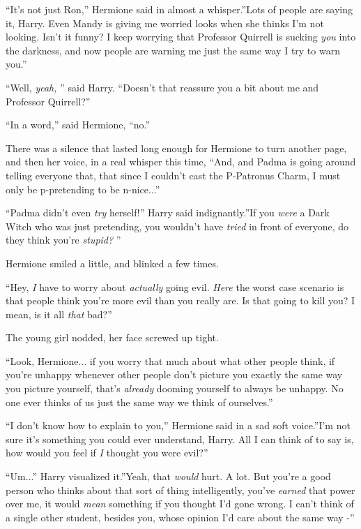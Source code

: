 ``It's not just Ron,'' Hermione said in almost a whisper.''Lots of
people are saying it, Harry. Even Mandy is giving me worried looks when
she thinks I'm not looking. Isn't it funny? I keep worrying that
Professor Quirrell is sucking \emph{you} into the darkness, and now
people are warning me just the same way I try to warn you.''

``Well, \emph{yeah,} '' said Harry. ``Doesn't that reassure you a bit
about me and Professor Quirrell?''

``In a word,'' said Hermione, ``no.''

There was a silence that lasted long enough for Hermione to turn another
page, and then her voice, in a real whisper this time, ``And, and Padma
is going around telling everyone that, that since I couldn't cast the
P-Patronus Charm, I must only be p-pretending to be n-nice...''

``Padma didn't even \emph{try} herself!'' Harry said indignantly.''If you
\emph{were} a Dark Witch who was just pretending, you wouldn't have
\emph{tried} in front of everyone, do they think you're \emph{stupid?} ''

Hermione smiled a little, and blinked a few times.

``Hey, \emph{I} have to worry about \emph{actually} going evil.
\emph{Here} the worst case scenario is that people think you're more
evil than you really are. Is that going to kill you? I mean, is it all
\emph{that} bad?''

The young girl nodded, her face screwed up tight.

``Look, Hermione... if you worry that much about what other people
think, if you're unhappy whenever other people don't picture you exactly
the same way you picture yourself, that's \emph{already} dooming
yourself to always be unhappy. No one ever thinks of us just the same
way we think of ourselves.''

``I don't know how to explain to you,'' Hermione said in a sad soft
voice.''I'm not sure it's something you could ever understand, Harry.
All I can think of to say is, how would you feel if \emph{I} thought you
were evil?''

``Um...'' Harry visualized it.''Yeah, that \emph{would} hurt. A
lot. But you're a good person who thinks about that sort of thing
intelligently, you've \emph{earned} that power over me, it would
\emph{mean} something if you thought I'd gone wrong. I can't think of a
single other student, besides you, whose opinion I'd care about the same
way -''

